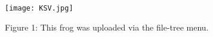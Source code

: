 \documentclass{article}
\begin{document}
	
	\begin{figure}
		\texttt{[image: KSV.jpg]}
		\caption{Figure 1: This frog was uploaded via the file-tree menu.}
	\end{figure}
\end{document}
